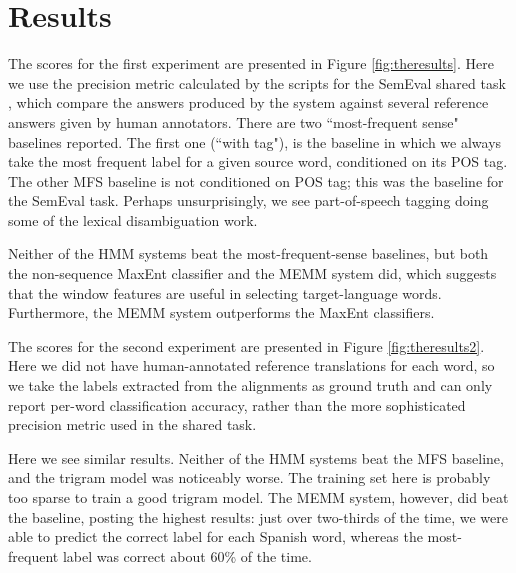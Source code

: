 \documentclass[11pt]{article}
\begin{document}
\section{Results}
The scores for the first experiment are presented in Figure
\ref{fig:theresults}. Here we use the precision metric calculated by the
scripts for the SemEval shared task \cite{task10}, which compare the answers
produced by the system against several reference answers given by human
annotators. There are two ``most-frequent sense" baselines reported.  The first
one (``with tag"), is the baseline in which we always take the most frequent
label for a given source word, conditioned on its POS tag. The other MFS
baseline is not conditioned on POS tag; this was the baseline for the SemEval
task.  Perhaps unsurprisingly, we see part-of-speech tagging doing some of the
lexical disambiguation work.

Neither of the HMM systems beat the most-frequent-sense baselines, but both the
non-sequence MaxEnt classifier and the MEMM system did, which suggests that the
window features are useful in selecting target-language words. Furthermore, the
MEMM system outperforms the MaxEnt classifiers.

The scores for the second experiment are presented in Figure
\ref{fig:theresults2}. Here we did not have human-annotated
reference translations for each word, so we take the labels extracted from the
alignments
as ground truth and can only report per-word classification accuracy,
rather than the more sophisticated precision metric used in the shared task.

Here we see similar results. Neither of the HMM systems beat the MFS baseline,
and the trigram model was noticeably worse. The training set here is probably
too sparse to train a good trigram model. The MEMM system, however, did beat
the baseline, posting the highest results: just over two-thirds of the time, we
were able to predict the correct label for each Spanish word, whereas the
most-frequent label was correct about 60\% of the time.


\end{document}
